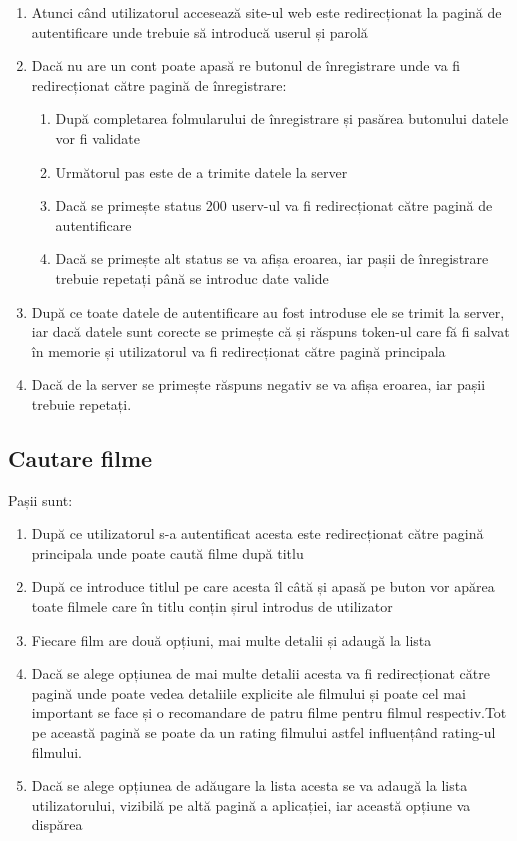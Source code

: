 \begin{enumerate}
  	\item Atunci când utilizatorul accesează site-ul web este redirecționat la pagină de autentificare unde trebuie să introducă userul și parolă
	\item Dacă nu are un cont poate apasă re butonul de înregistrare unde va fi redirecționat către pagină de înregistrare:
		\begin{enumerate}
		  	\item După completarea folmularului de înregistrare și pasărea butonului datele vor fi validate
			\item Următorul pas este de a trimite datele la server
			\item Dacă se primește status 200 userv-ul va fi redirecționat către pagină de autentificare
			\item Dacă se primește alt status se va afișa eroarea, iar pașii de înregistrare trebuie repetați până se introduc date valide 
		\end{enumerate}
	\item După ce toate datele de autentificare au fost introduse ele se trimit la server, iar dacă datele sunt corecte se primește că și răspuns token-ul care fă fi salvat în memorie și utilizatorul va fi redirecționat către pagină principala
	\item Dacă de la server se primește răspuns negativ se va afișa eroarea, iar pașii trebuie repetați.
\end{enumerate}

\subsection{Cautare filme}
\par Pașii sunt:

\begin{enumerate}
  	\item După ce utilizatorul s-a autentificat acesta este redirecționat către pagină principala unde poate caută filme după titlu
	\item După ce introduce titlul pe care acesta îl câtă și apasă pe buton vor apărea toate filmele care în titlu conțin șirul introdus de utilizator
	\item Fiecare film are două opțiuni, mai multe detalii și adaugă la lista
	\item Dacă se alege opțiunea de mai multe detalii acesta va fi redirecționat către pagină unde poate vedea detaliile explicite ale filmului și poate cel mai important se face și o recomandare de patru filme pentru filmul respectiv.Tot pe această pagină se poate da un rating filmului astfel influențând rating-ul filmului.
	\item Dacă se alege opțiunea de adăugare la lista acesta se va adaugă la lista utilizatorului, vizibilă pe altă pagină a aplicației, iar această opțiune va dispărea
\end{enumerate}


